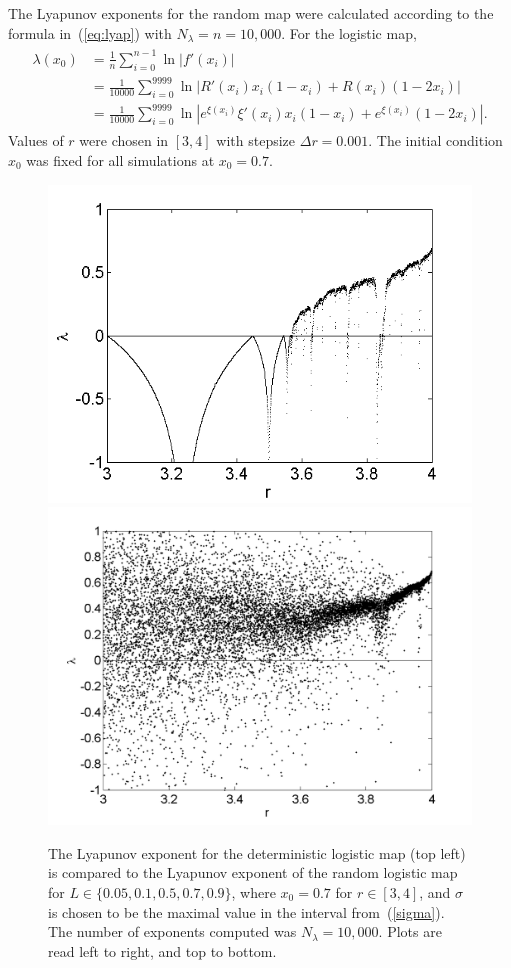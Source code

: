 The Lyapunov exponents for the random map were calculated according to
the formula in~(\ref{eq:lyap}) with $N_\lambda=n=10,000$. For the logistic map, 
\begin{align}
\begin{split}
\lambda(x_0) &= \frac{1}{n} \sum_{i=0}^{n-1} \ln |f'(x_i)|\\
&= \frac{1}{10000} \sum_{i=0}^{9999} \ln |R'(x_i)x_i(1-x_i) +R(x_i)(1-2x_i)|\\
&= \frac{1}{10000} \sum_{i=0}^{9999} \ln |e^{\xi(x_i)}\xi'(x_i)x_i(1-x_i)+e^{\xi(x_i)}(1-2x_i)|.
\end{split}
\end{align}
Values of $r$ were chosen in $[3,4]$ with stepsize $\Delta r =
0.001$. The initial condition $x_0$ was fixed for all
simulations at $x_0=0.7$.

\begin{figure}[!h]
\caption[Lyapunov exponent in the random logistic map compared to the
deterministic map, $\sigma=\sigma_{max}$]{The Lyapunov exponent for the deterministic
  logistic map (top left) is compared
  to the Lyapunov exponent of the random logistic map for $L \in
  \{0.05,0.1,0.5,0.7,0.9\}$, where $x_0=0.7$ for $r \in [3,4]$, and
  $\sigma$ is chosen to be the maximal value in the interval
  from~(\ref{sigma}). The number of exponents computed was $N_\lambda=10,000$. Plots are read left to right, and top to bottom. }\label{fig:rloglyap2}
\centering
\includegraphics[width=.5\textwidth]{figs/det_log_lyap.png}\hfill
\includegraphics[width=.5\textwidth]{figs/rlog_lyap_L_005.png}\\

\end{figure}
